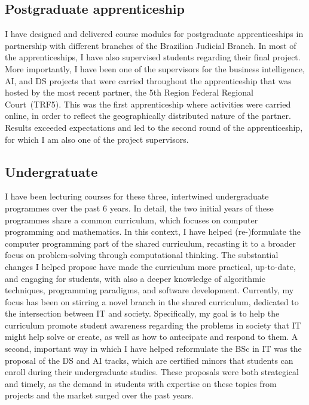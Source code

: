 \subsection{Postgraduate apprenticeship}
%
{I have designed and delivered course modules for postgraduate apprenticeships in partnership with different branches of the Brazilian Judicial Branch. In most of the apprenticeships, I have also supervised students regarding their final project. More importantly, I have been one of the supervisors for the business intelligence, AI, and DS projects that were carried throughout the apprenticeship that was hosted by the most recent partner, the 5th Region Federal Regional Court~(TRF5). This was the first apprenticeship where activities were carried online, in order to reflect the geographically distributed nature of the partner. Results exceeded expectations and led to the second round of the apprenticeship, for which I am also one of the project supervisors.}

\subsection{Undergratuate}
%
{I have been lecturing courses for these three, intertwined undergraduate programmes over the past 6 years. In detail, the two initial years of these programmes share a common curriculum, which focuses on computer programming and mathematics. In this context, I have helped (re-)formulate the computer programming part of the shared curriculum, recasting it to a broader focus on problem-solving through computational thinking. The substantial changes I helped propose have made the curriculum more practical, up-to-date, and engaging for students, with also a deeper knowledge of algorithmic techniques, programming paradigms, and software development. Currently, my focus has been on stirring a novel branch in the shared curriculum, dedicated to the intersection between IT and society. Specifically, my goal is to help the curriculum promote student awareness regarding the problems in society that IT might help solve or create, as well as how to antecipate and respond to them. A second, important way in which I have helped reformulate the BSc in IT was the proposal of the DS and AI tracks, which are certified minors that students can enroll during their undergraduate studies. These proposals were both strategical and timely, as the demand in students with expertise on these topics from projects and the market surged over the past years.}


